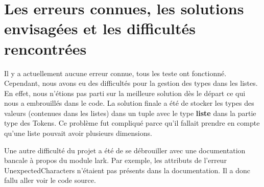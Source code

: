 \section{Les erreurs connues, les solutions envisagées et les difficultés rencontrées}
Il y a actuellement aucune erreur connue, tous les teste ont fonctionné. Cependant, nous avons eu des difficultés pour la gestion des types dans les listes.
En effet, nous n'étions pas parti sur la meilleure solution dès le départ ce qui nous a embrouillés dans le code.
La solution finale a été de stocker les types des valeurs (contenues dans les listes) dans un tuple avec le type \textbf{liste} dans la partie type des Tokens.
Ce problème fut compliqué parce qu'il fallait prendre en compte qu'une liste pouvait avoir plusieurs dimensions.

Une autre difficulté du projet a été de se débrouiller avec une documentation bancale à propos du module lark.
Par exemple, les attributs de l'erreur UnexpectedCharacters n'étaient pas présents dans la documentation. Il a donc fallu aller voir le code source.
